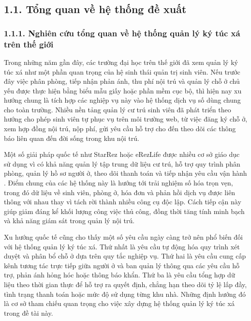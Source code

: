 \documentclass[12pt]{article}
\begin{document}
\subsection*{1.1. Tổng quan về hệ thống đề xuất}


\subsubsection*{1.1.1. Nghiên cứu tổng quan về hệ thống quản lý ký túc xá trên thế giới}

Trong những năm gần đây, các trường đại học trên thế giới đã xem quản lý ký túc xá như một phần quan trọng của hệ sinh thái quản trị sinh viên. Nếu trước đây việc phân phòng, tiếp nhận phản ánh, thu phí nội trú và quản lý chỗ ở chủ yếu được thực hiện bằng biểu mẫu giấy hoặc phần mềm cục bộ, thì hiện nay xu hướng chung là tích hợp các nghiệp vụ này vào hệ thống dịch vụ số dùng chung cho toàn trường. Nhiều nền tảng quản lý cư trú sinh viên đã phát triển theo hướng cho phép sinh viên tự phục vụ trên môi trường web, từ việc đăng ký chỗ ở, xem hợp đồng nội trú, nộp phí, gửi yêu cầu hỗ trợ cho đến theo dõi các thông báo liên quan đến đời sống trong khu nội trú.

Một số giải pháp quốc tế như StarRez hoặc eRezLife được nhiều cơ sở giáo dục sử dụng vì có khả năng quản lý tập trung dữ liệu cư trú, hỗ trợ quy trình phân phòng, quản lý hồ sơ người ở, theo dõi thanh toán và tiếp nhận yêu cầu vận hành \cite{starrez,erezlife}. Điểm chung của các hệ thống này là hướng tới trải nghiệm số hóa trọn vẹn, trong đó dữ liệu về sinh viên, phòng ở, hóa đơn và phản hồi dịch vụ được liên thông với nhau thay vì tách rời thành nhiều công cụ độc lập. Cách tiếp cận này giúp giảm đáng kể khối lượng công việc thủ công, đồng thời tăng tính minh bạch và khả năng giám sát trong quản lý nội trú.

Xu hướng quốc tế cũng cho thấy một số yêu cầu ngày càng trở nên phổ biến đối với hệ thống quản lý ký túc xá. Thứ nhất là yêu cầu tự động hóa quy trình xét duyệt và phân bổ chỗ ở dựa trên quy tắc nghiệp vụ. Thứ hai là yêu cầu cung cấp kênh tương tác trực tiếp giữa người ở và ban quản lý thông qua các yêu cầu hỗ trợ, phản ánh hỏng hóc hoặc thông báo khẩn. Thứ ba là yêu cầu tổng hợp dữ liệu theo thời gian thực để hỗ trợ ra quyết định, chẳng hạn theo dõi tỷ lệ lấp đầy, tình trạng thanh toán hoặc mức độ sử dụng từng khu nhà. Những định hướng đó là cơ sở tham chiếu quan trọng cho việc xây dựng hệ thống quản lý ký túc xá trong đề tài này.
\end{document}
